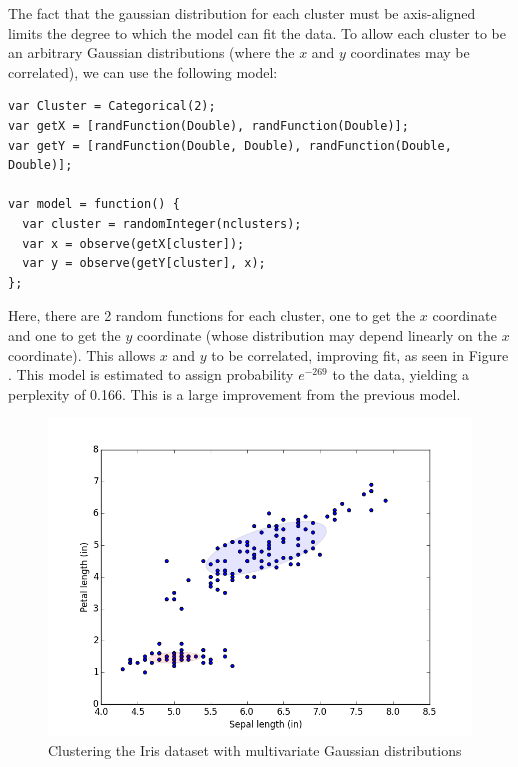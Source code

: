 \documentclass{article}
\begin{document}
  The fact that the gaussian distribution for each cluster must be axis-aligned limits the degree to which the model can fit the data.   To allow each cluster to be an arbitrary Gaussian distributions (where the $x$ and $y$ coordinates may be correlated),
  we can use the following model:

\begin{lstlisting}
var Cluster = Categorical(2);
var getX = [randFunction(Double), randFunction(Double)];
var getY = [randFunction(Double, Double), randFunction(Double, Double)];

var model = function() {
  var cluster = randomInteger(nclusters);
  var x = observe(getX[cluster]);
  var y = observe(getY[cluster], x);
};
\end{lstlisting}

Here, there are 2 random functions for each cluster, one to get the $x$ coordinate and one to get the $y$ coordinate (whose distribution may depend linearly on the $x$ coordinate).  This allows $x$ and $y$ to be correlated, improving fit, as seen in Figure \label{iris-dep}.
  This model is estimated to assign probability $e^{-269}$ to the data, yielding a perplexity of 0.166.  This is a large improvement from the previous model.

  \begin{figure}[h]
  \begin{center}
    \includegraphics[scale=0.5]{../plots/irisclusters_dep.png}
  \end{center}
  \caption{Clustering the Iris dataset with multivariate Gaussian distributions}
  \label{iris-dep}
\end{figure}
\end{document}
